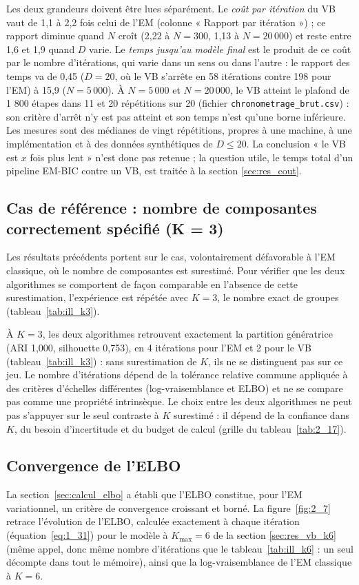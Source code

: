 Les deux grandeurs doivent être lues séparément. Le \emph{coût par itération} du VB vaut de 1,1 à 2,2 fois celui de l'EM (colonne « Rapport par itération ») ; ce rapport diminue quand $N$ croît (2,22 à $N = 300$, 1,13 à $N = 20\,000$) et reste entre 1,6 et 1,9 quand $D$ varie. Le \emph{temps jusqu'au modèle final} est le produit de ce coût par le nombre d'itérations, qui varie dans un sens ou dans l'autre : le rapport des temps va de 0,45 ($D = 20$, où le VB s'arrête en 58 itérations contre 198 pour l'EM) à 15,9 ($N = 5\,000$). À $N = 5\,000$ et $N = 20\,000$, le VB atteint le plafond de 1 800 étapes dans 11 et 20 répétitions sur 20 (fichier \texttt{chronometrage\_brut.csv}) : son critère d'arrêt n'y est pas atteint et son temps n'est qu'une borne inférieure. Les mesures sont des médianes de vingt répétitions, propres à une machine, à une implémentation et à des données synthétiques de $D \leq 20$. La conclusion « le VB est $x$ fois plus lent » n'est donc pas retenue ; la question utile, le temps total d'un pipeline EM-BIC contre un VB, est traitée à la section \ref{sec:res_cout}.

\subsection{Cas de référence : nombre de composantes correctement spécifié (K = 3)}\label{sec:res_k3}
Les résultats précédents portent sur le cas, volontairement défavorable à l'EM classique, où le nombre de composantes est surestimé. Pour vérifier que les deux algorithmes se comportent de façon comparable en l'absence de cette surestimation, l'expérience est répétée avec $K = 3$, le nombre exact de groupes (tableau~\ref{tab:ill_k3}).

À $K = 3$, les deux algorithmes retrouvent exactement la partition génératrice (ARI 1,000, silhouette 0,753), en 4 itérations pour l'EM et 2 pour le VB (tableau~\ref{tab:ill_k3}) : sans surestimation de $K$, ils ne se distinguent pas sur ce jeu. Le nombre d'itérations dépend de la tolérance relative commune appliquée à des critères d'échelles différentes (log-vraisemblance et ELBO) et ne se compare pas comme une propriété intrinsèque. Le choix entre les deux algorithmes ne peut pas s'appuyer sur le seul contraste à $K$ surestimé : il dépend de la confiance dans $K$, du besoin d'incertitude et du budget de calcul (grille du tableau~\ref{tab:2_17}).

\subsection{Convergence de l'ELBO}\label{sec:res_elbo}
La section~\ref{sec:calcul_elbo} a établi que l'ELBO constitue, pour l'EM variationnel, un critère de convergence croissant et borné. La figure~\ref{fig:2_7} retrace l'évolution de l'ELBO, calculée exactement à chaque itération (équation~\ref{eq:1_31}) pour le modèle à $K_{\max}=6$ de la section \ref{sec:res_vb_k6} (même appel, donc même nombre d'itérations que le tableau~\ref{tab:ill_k6} : un seul décompte dans tout le mémoire), ainsi que la log-vraisemblance de l'EM classique à $K=6$.

